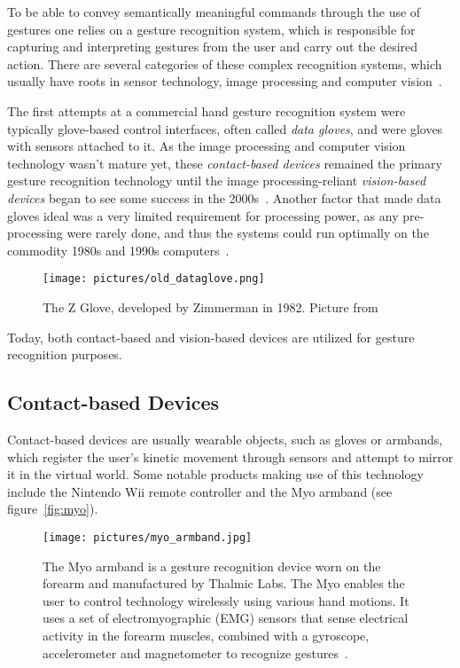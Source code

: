 To be able to convey semantically meaningful commands through the use of gestures one relies on a gesture recognition system, 
which is responsible for capturing and interpreting gestures from the user and carry out the desired action. 
There are several categories of these complex recognition systems, which usually have roots in sensor technology, 
image processing and computer vision~\citep{Vafadar2014}.

The first attempts at a commercial hand gesture recognition system were typically glove-based control interfaces, often called \textit{data gloves},
and were gloves with sensors attached to it. As the image processing and computer vision technology wasn't mature yet, these \textit{contact-based devices} remained 
the primary gesture recognition technology until the image processing-reliant \textit{vision-based devices} began to see some success in the 2000s~\citep{Premaratne2014}.
Another factor that made data gloves ideal was a very limited requirement for processing power, as any pre-processing were rarely done, 
and thus the systems could run optimally on the commodity 1980s and 1990s computers~\citep{Premaratne2014}.  


\begin{figure}%
	\texttt{[image: pictures/old\_dataglove.png]}
	\caption[The Z Glove]{The Z Glove, developed by Zimmerman in 1982. Picture from \citet{Premaratne2014}}
	\label{fig:old_dataglove}
\end{figure} 

Today, both contact-based and vision-based devices are utilized for gesture recognition purposes. 

\subsection{Contact-based Devices} 
Contact-based devices are usually wearable objects, such as gloves or armbands, 
which register the user's kinetic movement through sensors and attempt to mirror it in the virtual world. 
Some notable products making use of this technology include the Nintendo Wii remote controller and the Myo armband (see figure~\vref{fig:myo}). 

\begin{figure}%
	\texttt{[image: pictures/myo\_armband.jpg]}
	\caption[The Myo armband]{The Myo armband is a gesture recognition device worn on the forearm and manufactured by Thalmic Labs. 
	The Myo enables the user to control technology wirelessly using various hand motions. 
	It uses a set of electromyographic (EMG) sensors that sense electrical activity in the forearm muscles, combined with a gyroscope, 
	accelerometer and magnetometer to recognize gestures~\citep{Myo2015}.}
	\label{fig:myo}
\end{figure}

